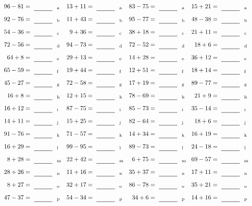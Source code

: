 \documentclass
[
  draft    = true,
  fontsize = 11pt,
  parskip  = half-
]
{scrartcl}
\begin{document}
\clearpage
\begin{align*}
    \pline{96-81}&=\rline{a}
  & \pline{13+11}&=\rline{a}
  & \pline{83-75}&=\rline{a}
  & \pline{15+21}&=\rline{a} \\[1ex]
    \pline{92-76}&=\rline{b}
  & \pline{11+43}&=\rline{b}
  & \pline{95-77}&=\rline{b}
  & \pline{48-38}&=\rline{b} \\[1ex]
    \pline{54-36}&=\rline{c}
  & \pline{9+36}&=\rline{c}
  & \pline{38+18}&=\rline{c}
  & \pline{21+11}&=\rline{c} \\[1ex]
    \pline{72-56}&=\rline{d}
  & \pline{94-73}&=\rline{d}
  & \pline{72-52}&=\rline{d}
  & \pline{18+6}&=\rline{d} \\[1ex]
    \pline{64+8}&=\rline{e}
  & \pline{29+13}&=\rline{e}
  & \pline{14+28}&=\rline{e}
  & \pline{36+12}&=\rline{e} \\[1ex]
    \pline{65-59}&=\rline{f}
  & \pline{19+44}&=\rline{f}
  & \pline{12+51}&=\rline{f}
  & \pline{18+14}&=\rline{f} \\[1ex]
    \pline{45-27}&=\rline{g}
  & \pline{72-58}&=\rline{g}
  & \pline{17+19}&=\rline{g}
  & \pline{89-77}&=\rline{g} \\[1ex]
    \pline{16+8}&=\rline{h}
  & \pline{12+15}&=\rline{h}
  & \pline{78-69}&=\rline{h}
  & \pline{21+9}&=\rline{h} \\[1ex]
    \pline{16+12}&=\rline{i}
  & \pline{87-75}&=\rline{i}
  & \pline{85-73}&=\rline{i}
  & \pline{35-14}&=\rline{i} \\[1ex]
    \pline{14+11}&=\rline{j}
  & \pline{15+25}&=\rline{j}
  & \pline{82-64}&=\rline{j}
  & \pline{18+6}&=\rline{j} \\[1ex]
    \pline{91-76}&=\rline{k}
  & \pline{71-57}&=\rline{k}
  & \pline{14+34}&=\rline{k}
  & \pline{16+19}&=\rline{k} \\[1ex]
    \pline{16+29}&=\rline{l}
  & \pline{99-95}&=\rline{l}
  & \pline{89-73}&=\rline{l}
  & \pline{24-18}&=\rline{l} \\[1ex]
    \pline{8+28}&=\rline{m}
  & \pline{22+42}&=\rline{m}
  & \pline{6+75}&=\rline{m}
  & \pline{69-57}&=\rline{m} \\[1ex]
    \pline{28+26}&=\rline{n}
  & \pline{11+16}&=\rline{n}
  & \pline{35+37}&=\rline{n}
  & \pline{17+11}&=\rline{n} \\[1ex]
    \pline{8+27}&=\rline{o}
  & \pline{32+17}&=\rline{o}
  & \pline{86-78}&=\rline{o}
  & \pline{35+21}&=\rline{o} \\[1ex]
    \pline{47-37}&=\rline{p}
  & \pline{54-34}&=\rline{p}
  & \pline{34+6}&=\rline{p}
  & \pline{14+16}&=\rline{p}
\end{align*}
\end{document}
